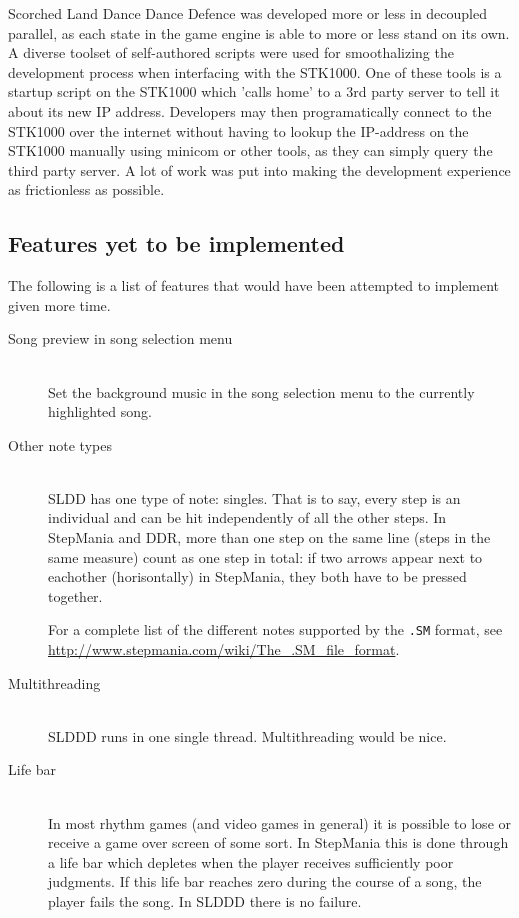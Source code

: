 Scorched Land Dance Dance Defence was developed more or less in decoupled parallel, as each state in the game engine is able to more or less stand on its own.
A diverse toolset of self-authored scripts were used for smoothalizing the development process when interfacing with the STK1000.
One of these tools is a startup script on the STK1000 which 'calls home' to a 3rd party server to tell it about its new IP address.
Developers may then programatically connect to the STK1000 over the internet without having to lookup the IP-address on the STK1000 manually using minicom or other tools, as they can simply query the third party server.
A lot of work was put into making the development experience as frictionless as possible.


\subsection{Features yet to be implemented}
	The following is a list of features that would have been attempted to implement given more time.

	\begin{description}	
		\item[Song preview in song selection menu] \hfill \\
			Set the background music in the song selection menu to the currently highlighted song.
		\item[Other note types] \hfill \\
			SLDD has one type of note: singles. That is to say, every step is an individual and can be hit independently of all the other steps.
			In StepMania and DDR, more than one step on the same line (steps in the same measure) count as one step in total: if two arrows appear next to eachother (horisontally) in StepMania, they both have to be pressed together.

			For a complete list of the different notes supported by the \texttt{.SM} format, see \url{http://www.stepmania.com/wiki/The_.SM_file_format}.
		\item[Multithreading] \hfill \\
			SLDDD runs in one single thread.
			Multithreading would be nice.
		\item[Life bar] \hfill \\
			In most rhythm games (and video games in general) it is possible to lose or receive a game over screen of some sort.
			In StepMania this is done through a life bar which depletes when the player receives sufficiently poor judgments.
			If this life bar reaches zero during the course of a song, the player fails the song.
			In SLDDD there is no failure.
	\end{description}


